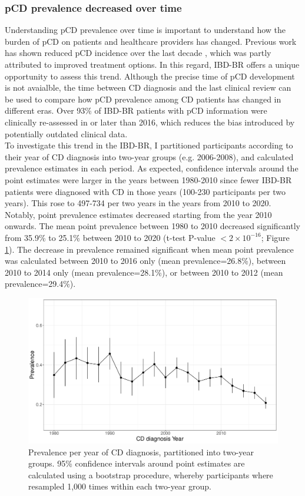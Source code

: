     \subsubsection{pCD prevalence decreased over time}
    Understanding pCD prevalence over time is important to understand how the burden of pCD on patients and healthcare providers has changed. Previous work has shown reduced pCD incidence over the last decade \cite{Park2019-kj}, which was partly attributed to improved treatment options. In this regard, IBD-BR offers a unique opportunity to assess this trend. Although the precise time of pCD development is not avaialble, the time between CD diagnosis and the last clinical review can be used to compare how pCD prevalence among CD patients has changed in different eras. Over 93\% of IBD-BR patients with pCD information were clinically re-assessed in or later than 2016, which reduces the bias introduced by potentially outdated clinical data. \\
    
    To investigate this trend in the IBD-BR, I partitioned participants according to their year of CD diagnosis into two-year groups (e.g. 2006-2008), and calculated prevalence estimates in each period. As expected, confidence intervals around the point estimates were larger in the years between 1980-2010 since fewer IBD-BR patients were diagnosed with CD in those years (100-230 participants per two years). This rose to 497-734 per two years in the years from 2010 to 2020.  Notably, point prevalence estimates decreased starting from the year 2010 onwards. The mean point prevalence between 1980 to 2010 decreased significantly from 35.9\% to 25.1\% between 2010 to 2020 (t-test P-value $<2\times10^{-16}$; Figure \ref{fig:pcd_prev}). The decrease in prevalence remained significant when mean point prevalence was calculated between 2010 to 2016 only (mean prevalence=26.8\%), between 2010 to 2014 only (mean prevalence=28.1\%), or between 2010 to 2012 (mean prevalence=29.4\%).\\
    \begin{figure}[htb] 
      \centering    
      \includegraphics[width=1.0\textwidth]{fig2}
      \caption[Figure]{Prevalence per year of CD diagnosis, partitioned into two-year groups. 95\% confidence intervals around point estimates are calculated using a bootstrap procedure, whereby participants where resampled 1,000 times within each two-year group.}
      \label{fig:pcd_prev}
      \end{figure}
 
